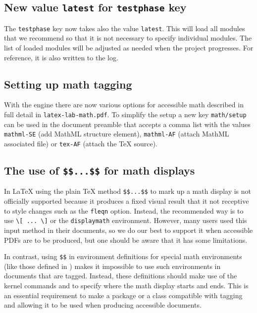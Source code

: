 \documentclass{ltnews}
\providecommand\env[1]{\texttt{#1}}
\providecommand\LuaTeX{\hologo{LuaTeX}}
\providecommand\env[1]{\texttt{#1}}
\begin{document}
\subsection{New value \texttt{latest} for \texttt{testphase} key}

The \texttt{testphase} key now takes also the value \texttt{latest}.
This will load all modules that we recommend so that it is not
necessary to specify individual modules. The list of loaded modules
will be adjusted as needed when the project progresses. For reference,
it is also written to the log.



\subsection{Setting up math tagging}

With the \LuaTeX{} engine there are now various options for accessible
math described in full detail in \texttt{latex-lab-math.pdf}. To
simplify the setup a new key \texttt{math/setup} can be used in the
document preamble that accepts a comma list with the values
\texttt{mathml-SE} (add MathML structure element), \texttt{mathml-AF}
(attach MathML associated file) or \texttt{tex-AF} (attach the TeX
source).

\subsection{The use of \texttt{\$\$...\$\$} for math displays}

In \LaTeX{} using the plain \TeX{} method \verb=$$...$$= to mark up a
math display is not officially supported because it produces a fixed
visual result that it not receptive to style changes such as the
\texttt{fleqn} option. Instead, the recommended way is to use
\verb=\[ ... \]= or the \env{displaymath} environment. However, many
users used this input method in their documents, so we do our best to
support it when accessible PDFs are to be produced, but one should be
aware that it has some limitations.

In contrast, using \verb=$$= in environment definitions for special
math environments (like those defined in ) makes it
impossible to use such environments in documents that are
tagged. Instead,  these definitions should make use of the kernel commands
 and  to specify where the
math display starts and ends. This is an essential requirement to
make a package or a class compatible with tagging and allowing it to
be used when producing accessible documents.
\end{document}

